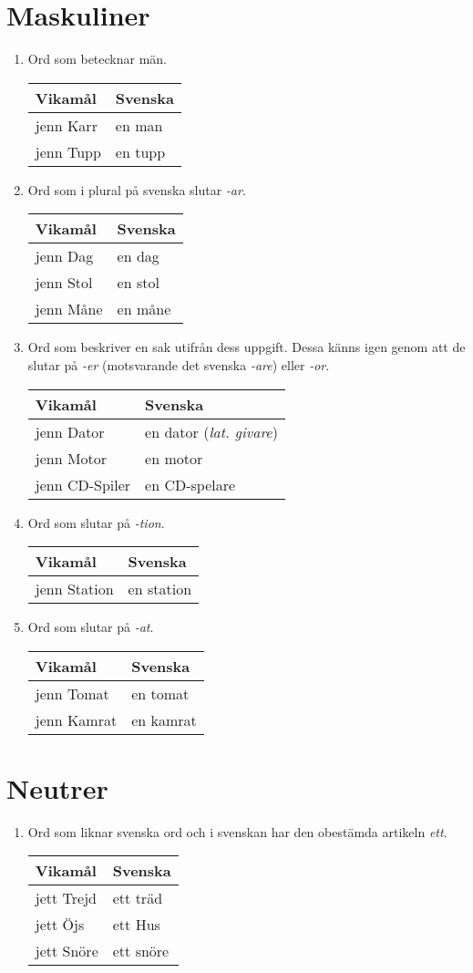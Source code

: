 \documentclass[a4paper]{memoir}
\newcommand{\eline}{\\[\baselineskip]} %
\newenvironment{mytable}[2]
{
  \eline
  \begin{tabular}{#1}
  \hline #2\\ \hline
}
{ \end{tabular} }
\newcommand{\myheader}[1]{ \hline #1\\ \hline }
\newenvironment{wlistvisv} %
{ \begin{mytable}{ l l }{Vikamål & Svenska} }
{ \end{mytable} }
\newenvironment{rlist} %
{ \begin{enumerate}[label=\Alph*] }
{ \end{enumerate} }
\begin{document}
    \section{Maskuliner}
      \begin{rlist}
        \item Ord som betecknar män.
        \begin{wlistvisv}
          jenn Karr & en man\\
          jenn Tupp & en tupp\\
        \end{wlistvisv}
        \item Ord som i plural på svenska slutar \emph{-ar}.
        \begin{wlistvisv}
          jenn Dag & en dag\\
          jenn Stol & en stol\\
          jenn Måne & en måne\\
        \end{wlistvisv}
        \item Ord som beskriver en sak utifrån dess uppgift. Dessa känns igen genom att de slutar på \emph{-er} (motsvarande det svenska \emph{-are}) eller \emph{-or}.
        \begin{wlistvisv}
          jenn Dator & en dator (\emph{lat. givare})\\
          jenn Motor & en motor\\
          jenn CD-Spiler & en CD-spelare\\
        \end{wlistvisv}
        \item Ord som slutar på \emph{-tion}.
        \begin{wlistvisv}
          jenn Station & en station\\
        \end{wlistvisv}
        \item Ord som slutar på \emph{-at}.
        \begin{wlistvisv}
          jenn Tomat & en tomat\\
          jenn Kamrat & en kamrat\\
        \end{wlistvisv}
      \end{rlist}
    \section{Neutrer}
      \begin{rlist}
        \item Ord som liknar svenska ord och i svenskan har den obestämda artikeln \emph{ett}.
        \begin{wlistvisv}
          jett Trejd & ett träd\\
          jett Öjs & ett Hus\\
          jett Snöre & ett snöre\\
        \end{wlistvisv}
      \end{rlist}
\end{document}
